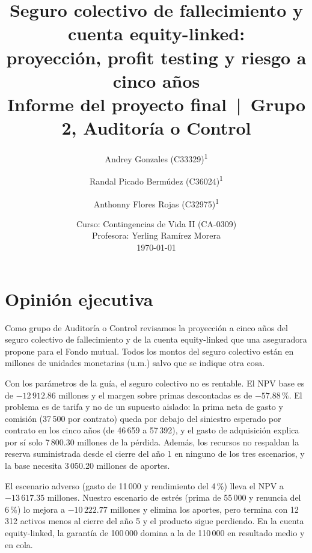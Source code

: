 \documentclass[10pt,a4paper]{article}
\title{\textbf{Seguro colectivo de fallecimiento y cuenta equity-linked:\\ proyección, profit testing y riesgo a cinco años} \\[0.4em]
	\large Informe del proyecto final \,|\, Grupo 2, Auditoría o Control}
\author{%
	Andrey Gonzales (C33329)\textsuperscript{1} \and
	Randal Picado Bermúdez (C36024)\textsuperscript{1} \and
	Anthonny Flores Rojas (C32975)\textsuperscript{1}}
\date{Curso: Contingencias de Vida II (CA-0309) \\
	Profesora: Yerling Ramírez Morera \\[0.3em] \today}
\numberwithin{equation}{section}
\newcommand{\um}{u.m.}
\begin{document}
	\maketitle

	\section*{Opinión ejecutiva}\label{sec:opinion}

	Como grupo de Auditoría o Control revisamos la proyección a cinco años del seguro colectivo de fallecimiento y de la cuenta equity-linked que una aseguradora propone para el Fondo mutual. Todos los montos del seguro colectivo están en millones de unidades monetarias (\um) salvo que se indique otra cosa.

	Con los parámetros de la guía, el seguro colectivo no es rentable. El NPV base es de \(-12\,912.86\) millones y el margen sobre primas descontadas es de \(-57.88\,\%\). El problema es de tarifa y no de un supuesto aislado: la prima neta de gasto y comisión (37\,500 por contrato) queda por debajo del siniestro esperado por contrato en los cinco años (de 46\,659 a 57\,392), y el gasto de adquisición explica por sí solo 7\,800.30 millones de la pérdida. Además, los recursos no respaldan la reserva suministrada desde el cierre del año 1 en ninguno de los tres escenarios, y la base necesita 3\,050.20 millones de aportes.

	El escenario adverso (gasto de 11\,000 y rendimiento del 4\,\%) lleva el NPV a \(-13\,617.35\) millones. Nuestro escenario de estrés (prima de 55\,000 y renuncia del 6\,\%) lo mejora a \(-10\,222.77\) millones y elimina los aportes, pero termina con 12\,312 activos menos al cierre del año 5 y el producto sigue perdiendo. En la cuenta equity-linked, la garantía de 100\,000 domina a la de 110\,000 en resultado medio y en cola.

	\begin{center}
	\end{center}
\end{document}
